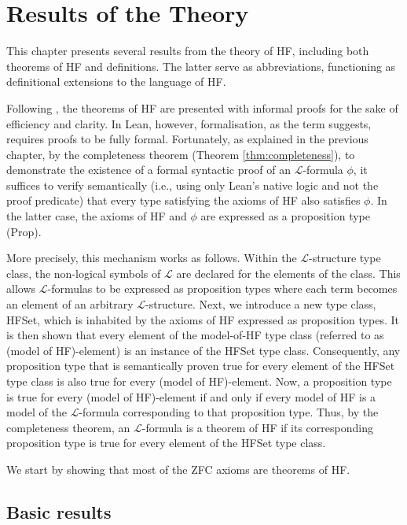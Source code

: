 \chapter{Results of the Theory}

This chapter presents several results from the theory of HF, 
including both theorems of HF and definitions. The latter serve as abbreviations, 
functioning as definitional extensions to the language of HF.

Following \cite{swierczkowski2003finite}, the theorems of HF are presented with informal proofs 
for the sake of efficiency and clarity. 
In Lean, however, formalisation, as the term suggests, requires proofs to be fully formal. 
Fortunately, as explained in the previous chapter, by the completeness theorem 
(Theorem \ref{thm:completeness}), to demonstrate the existence of a formal syntactic proof of 
an $\mathcal{L}$-formula $\phi$, 
it suffices to verify semantically 
(i.e., using only Lean's native logic and not the proof predicate) that 
every type satisfying the axioms of HF also satisfies $\phi$. 
In the latter case, the axioms of HF and $\phi$ are expressed as a proposition type 
({\ttfamily \small Prop}).


More precisely, this mechanism works as follows.
Within the $\mathcal{L}$-structure type class, the non-logical symbols of $\mathcal{L}$ are 
declared for the elements of the class. 
This allows $\mathcal{L}$-formulas to be expressed
as proposition types where each term becomes an element of an arbitrary $\mathcal{L}$-structure.
Next, we introduce a new type class, {\ttfamily \small HFSet}, 
which is inhabited by the axioms of HF expressed as proposition types. 
It is then shown that every element of the model-of-HF type class 
(referred to as (model of HF)-element) is an instance of the {\ttfamily \small HFSet} type class.
Consequently, any proposition type that is semantically proven true for every element of 
the {\ttfamily \small HFSet} type class is also true for every (model of HF)-element.
Now, a proposition type is true for every (model of HF)-element if and only if 
every model of HF is a model of the $\mathcal{L}$-formula corresponding to that proposition type.
Thus, by the completeness theorem, an $\mathcal{L}$-formula is a theorem of HF if its corresponding 
proposition type is true for every element of the {\ttfamily \small HFSet} type class.

We start by showing that most of the ZFC axioms are theorems of HF.

\section{Basic results}

